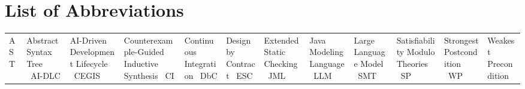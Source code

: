 \chapter*{List of Abbreviations}

\begin{tabular}{@{}ll@{}}
AST     & Abstract Syntax Tree \
AI-DLC  & AI-Driven Development Lifecycle \
CEGIS   & Counterexample-Guided Inductive Synthesis \
CI      & Continuous Integration \
DbC     & Design by Contract \
ESC     & Extended Static Checking \
JML     & Java Modeling Language \
LLM     & Large Language Model \
SMT     & Satisfiability Modulo Theories \
SP      & Strongest Postcondition \
WP      & Weakest Precondition \
\end{tabular}
